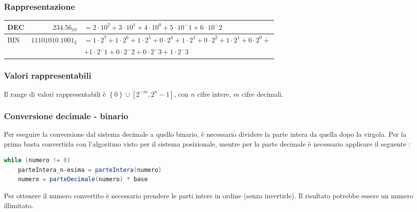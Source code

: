\documentclass[a4paper]{article}
\begin{document}
\subsubsection*{Rappresentazione}
\begin{center}
	\begin{tabularx}{\textwidth}{l r X}
		DEC & \(234.56_{10}\) & \(= 2 \cdot 10 ^ 2 + 3 \cdot 10 ^ 1 + 4 \cdot 10 ^ 0 + 5 \cdot 10 ^ -1 + 6 \cdot 10 ^ -2\) \\
		\midrule
		\multirow{2}{*}{BIN} & \multirow{2}{*}{\(11101010.1001_2\)} & \(= 1 \cdot 2 ^ 7 + 1 \cdot 2 ^ 6 + 1 \cdot 2 ^ 5 + 0 \cdot 2 ^ 4 + 1 \cdot 2 ^ 3 + 0 \cdot 2 ^ 2 + 1 \cdot 2 ^ 1 + 0 \cdot 2 ^ 0 +\) \\
		& & \(+ 1 \cdot 2 ^ -1 + 0 \cdot 2 ^ -2 + 0 \cdot 2 ^ -3 + 1 \cdot 2 ^ -3\)
	\end{tabularx}
\end{center}

\subsubsection*{Valori rappresentabili}
Il range di valori rappresentabili è \(\left\{0\right\} \cup \left[ 2^{-m}, 2^n - 1 \right]\), con \(n\) cifre intere, \(m\) cifre decimali.

\subsubsection*{Conversione decimale - binario}
Per eseguire la conversione dal sistema decimale a quello binario, è necessario dividere la parte intera da quella dopo
la virgola. Per la prima basta convertirla con l'algoritmo visto per il sistema posizionale, mentre per la parte decimale
è necessario applicare il seguente :
\begin{lstlisting}[language=Java]
while (numero != 0)
	parteIntera_n-esima = parteIntera(numero)
	numero = parteDecimale(numero) * base
\end{lstlisting}
Per ottenere il numero convertito è necessario prendere le parti intere in ordine (senza invertirle). Il risultato potrebbe
essere un numero illimitato.
\end{document}
